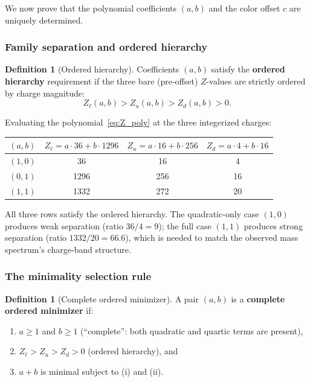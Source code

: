 \documentclass[11pt,a4paper]{article}
\theoremstyle{definition}
\newtheorem{definition}[theorem]{Definition}
\theoremstyle{remark}
\newcommand{\Zidx}{Z}
\begin{document}
We now prove that the polynomial coefficients $(a, b)$ and the color offset
$c$ are uniquely determined.

\subsubsection{Family separation and ordered hierarchy}

\begin{definition}[Ordered hierarchy]
\label{def:ordered_hierarchy}
Coefficients $(a, b)$ satisfy the \textbf{ordered hierarchy} requirement if
the three bare (pre-offset) $\Zidx$-values are strictly ordered by charge
magnitude:
\[
  \Zidx_{\ell}(a,b) > \Zidx_{u}(a,b) > \Zidx_{d}(a,b) > 0.
\]
\end{definition}

\noindent
Evaluating the polynomial~\eqref{eq:Z_poly} at the three integerized charges:
\begin{center}
\begin{tabular}{cccc}
\toprule
$(a, b)$ & $\Zidx_\ell = a \cdot 36 + b \cdot 1296$ &
  $\Zidx_u = a \cdot 16 + b \cdot 256$ &
  $\Zidx_d = a \cdot 4 + b \cdot 16$ \\
\midrule
$(1, 0)$ & 36 & 16 & 4 \\
$(0, 1)$ & 1296 & 256 & 16 \\
$(1, 1)$ & 1332 & 272 & 20 \\
\bottomrule
\end{tabular}
\end{center}

All three rows satisfy the ordered hierarchy.  The quadratic-only case
$(1, 0)$ produces weak separation (ratio $36/4 = 9$); the full case
$(1, 1)$ produces strong separation (ratio $1332/20 = 66.6$), which is
needed to match the observed mass spectrum's charge-band structure.

\subsubsection{The minimality selection rule}

\begin{definition}[Complete ordered minimizer]
\label{def:complete_minimizer}
A pair $(a, b)$ is a \textbf{complete ordered minimizer} if:
\begin{enumerate}[nosep,label=(\roman*)]
  \item $a \geq 1$ and $b \geq 1$ (``complete'': both quadratic and quartic
        terms are present),
  \item $\Zidx_\ell > \Zidx_u > \Zidx_d > 0$ (ordered hierarchy), and
  \item $a + b$ is minimal subject to (i) and (ii).
\end{enumerate}
\end{definition}
\end{document}
